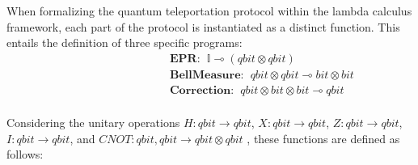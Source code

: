 When formalizing the quantum teleportation protocol within the lambda calculus framework, each part of the protocol is instantiated as a distinct function. This entails the definition of three specific programs:
\begin{align*}
   \hspace{100pt} & \textbf{EPR}: \hspace{5pt} \mathbb{I} \multimap (\textit{qbit} \otimes \textit{qbit}) \\ 
    &\textbf{BellMeasure}: \hspace{5pt} \textit{qbit} \otimes \textit{qbit}  \multimap \textit{bit} \otimes \textit{bit} \\
    &\textbf{Correction}: \hspace{5pt} \textit{qbit} \otimes \textit{bit} \otimes \textit{bit}  \multimap \textit{qbit} \\
\end{align*}


Considering the unitary operations $H: \textit{qbit} \xrightarrow{}  \textit{qbit}$, $X: \textit{qbit} \xrightarrow{}  \textit{qbit}$, $Z: \textit{qbit} \xrightarrow{}  \textit{qbit}$, $I: \textit{qbit} \xrightarrow{}  \textit{qbit}$, and $\textit{CNOT}: \textit{qbit}, \textit{qbit} \xrightarrow{}  \textit{qbit} \otimes \textit{qbit}$ , these functions are defined as follows:

